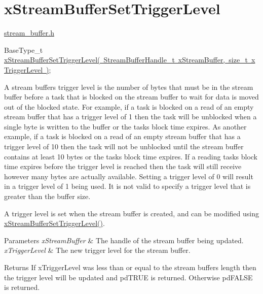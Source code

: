 \hypertarget{group__x_stream_buffer_set_trigger_level}{}\section{x\+Stream\+Buffer\+Set\+Trigger\+Level}
\label{group__x_stream_buffer_set_trigger_level}
\mbox{\hyperlink{stream__buffer_8h}{stream\+\_\+buffer.\+h}}


\begin{DoxyPre}
BaseType\_t \mbox{\hyperlink{stream__buffer_8h_a28f0280587c76e71efeaa8f415ebde04}{xStreamBufferSetTriggerLevel( StreamBufferHandle\_t xStreamBuffer, size\_t xTriggerLevel )}};
\end{DoxyPre}


A stream buffer\textquotesingle{}s trigger level is the number of bytes that must be in the stream buffer before a task that is blocked on the stream buffer to wait for data is moved out of the blocked state. For example, if a task is blocked on a read of an empty stream buffer that has a trigger level of 1 then the task will be unblocked when a single byte is written to the buffer or the task\textquotesingle{}s block time expires. As another example, if a task is blocked on a read of an empty stream buffer that has a trigger level of 10 then the task will not be unblocked until the stream buffer contains at least 10 bytes or the task\textquotesingle{}s block time expires. If a reading task\textquotesingle{}s block time expires before the trigger level is reached then the task will still receive however many bytes are actually available. Setting a trigger level of 0 will result in a trigger level of 1 being used. It is not valid to specify a trigger level that is greater than the buffer size.

A trigger level is set when the stream buffer is created, and can be modified using \mbox{\hyperlink{stream__buffer_8h_a28f0280587c76e71efeaa8f415ebde04}{x\+Stream\+Buffer\+Set\+Trigger\+Level()}}.


\begin{DoxyParams}{Parameters}
{\em x\+Stream\+Buffer} & The handle of the stream buffer being updated.\\
\hline
{\em x\+Trigger\+Level} & The new trigger level for the stream buffer.\\
\hline
\end{DoxyParams}
\begin{DoxyReturn}{Returns}
If x\+Trigger\+Level was less than or equal to the stream buffer\textquotesingle{}s length then the trigger level will be updated and pd\+T\+R\+UE is returned. Otherwise pd\+F\+A\+L\+SE is returned. 
\end{DoxyReturn}
